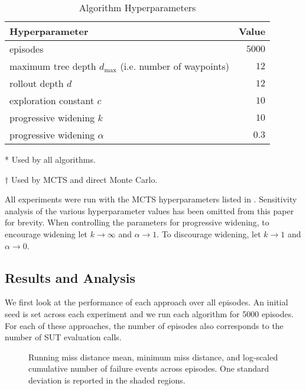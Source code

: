 \begin{table}[!ht]
  \centering
  \caption{\label{tab:mcts_params} Algorithm Hyperparameters}
  \begin{threeparttable}
  \begin{tabular}{@{}p{10cm}r@{}}
    \toprule
    \textbf{Hyperparameter} & \textbf{Value} \\
    \midrule
    episodes \tnote{*} & $5000$ \\
    maximum tree depth $d_\text{max}$ (i.e. number of waypoints) \tnote{*} & $12$ \\
    rollout depth $d$ \tnote{$\dagger$} & $12$ \\
    exploration constant $c$ & $10$ \\
    progressive widening $k$ & $10$ \\
    progressive widening $\alpha$ & $0.3$ \\
    \bottomrule
  \end{tabular}
  \begin{tablenotes}
      \item[*] {Used by all algorithms.}
      \item[$\dagger$] {Used by MCTS and direct Monte Carlo.}
  \end{tablenotes}
  \end{threeparttable}
\end{table}


All experiments were run with the MCTS hyperparameters listed in .
Sensitivity analysis of the various hyperparameter values has been omitted from this paper for brevity.
When controlling the parameters for progressive widening, to encourage widening let $k \to \infty$ and $\alpha \to 1$. To discourage widening, let $k \to 1$ and $\alpha \to 0$.


\subsection{Results and Analysis}

We first look at the performance of each approach over all episodes.
An initial seed is set across each experiment and we run each algorithm for 5000 episodes.
For each of these approaches, the number of episodes also corresponds to the number of SUT evaluation calls.

\begin{figure}[!ht]
\centering
\resizebox{0.8\columnwidth}{!}{}
\caption{Running miss distance mean, minimum miss distance, and log-scaled cumulative number of failure events across episodes. One standard deviation is reported in the shaded regions.}
\label{fig:episodes}
\end{figure}

